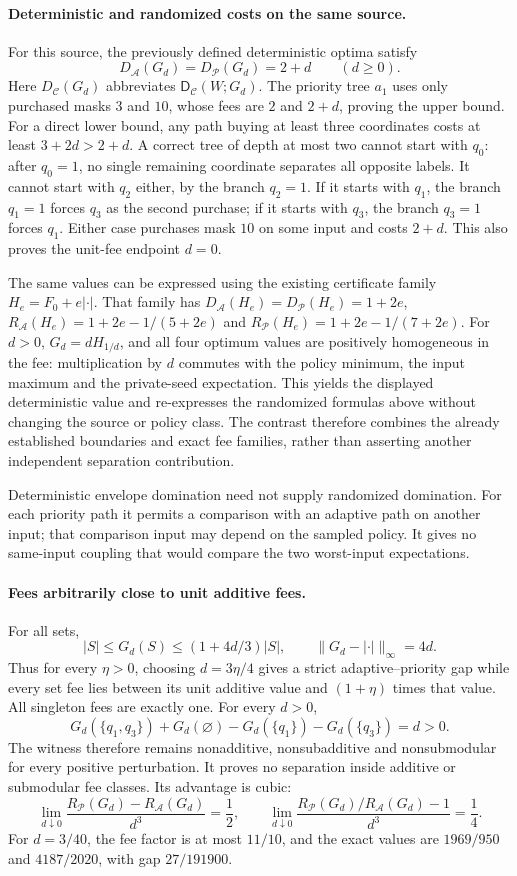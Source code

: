 \documentclass[pdflatex,sn-mathphys-num]{sn-jnl}
\newcommand{\DR}{\mathsf{D}}
\theoremstyle{thmstyleone}
\theoremstyle{thmstylethree}
\theoremstyle{thmstyletwo}
\begin{document}
\paragraph*{Deterministic and randomized costs on the same source.}
For this source, the previously defined deterministic optima satisfy
\[
 D_{\mathcal A}(G_d)=D_{\mathcal P}(G_d)=2+d\qquad(d\geq0).
\]
Here $D_{\mathcal C}(G_d)$ abbreviates
$\DR_{\mathcal C}(W;G_d)$.
The priority tree $a_1$ uses only purchased masks $3$ and $10$, whose
fees are $2$ and $2+d$, proving the upper bound. For a direct lower
bound, any path buying at least three coordinates costs at least
$3+2d>2+d$. A correct tree of depth at most two cannot start with
$q_0$: after $q_0=1$, no single remaining coordinate separates all
opposite labels. It cannot start with $q_2$ either, by the branch
$q_2=1$. If it starts with $q_1$, the branch $q_1=1$ forces $q_3$
as the second purchase; if it starts with $q_3$, the branch $q_3=1$
forces $q_1$. Either case purchases mask $10$ on some input and costs
$2+d$. This also proves the unit-fee endpoint $d=0$.

The same values can be expressed using the existing certificate
family $H_e=F_0+e|\cdot|$. That family has
$D_{\mathcal A}(H_e)=D_{\mathcal P}(H_e)=1+2e$,
$R_{\mathcal A}(H_e)=1+2e-1/(5+2e)$ and
$R_{\mathcal P}(H_e)=1+2e-1/(7+2e)$.
For $d>0$, $G_d=dH_{1/d}$, and all four optimum values are positively
homogeneous in the fee: multiplication by $d$ commutes with the
policy minimum, the input maximum and the private-seed expectation.
This yields the displayed deterministic value and re-expresses the
randomized formulas above without changing the source or policy
class. The contrast therefore combines the already established
boundaries and exact fee families, rather than asserting another
independent separation contribution.

Deterministic envelope domination need not supply randomized
domination. For each priority path it permits a comparison with an
adaptive path on another input; that comparison input may depend on
the sampled policy. It gives no same-input coupling that would
compare the two worst-input expectations.

\paragraph*{Fees arbitrarily close to unit additive fees.}
For all sets,
\[
 |S|\le G_d(S)\le(1+4d/3)|S|,
 \qquad \|G_d-|\cdot|\|_\infty=4d.
\]
Thus for every $\eta>0$, choosing $d=3\eta/4$ gives a strict
adaptive--priority gap while every set fee lies between its unit
additive value and $(1+\eta)$ times that value. All singleton fees are
exactly one. For every $d>0$,
\[
 G_d(\{q_1,q_3\})+G_d(\varnothing)
       -G_d(\{q_1\})-G_d(\{q_3\})=d>0.
\]
The witness therefore remains nonadditive, nonsubadditive and
nonsubmodular for every positive perturbation. It proves no separation
inside additive or submodular fee classes. Its advantage is cubic:
\[
 \lim_{d\downarrow0}
 \frac{R_{\mathcal P}(G_d)-R_{\mathcal A}(G_d)}{d^3}=\frac12,
 \qquad
 \lim_{d\downarrow0}
 \frac{R_{\mathcal P}(G_d)/R_{\mathcal A}(G_d)-1}{d^3}=\frac14.
\]
For $d=3/40$, the fee factor is at most $11/10$, and the exact values
are $1969/950$ and $4187/2020$, with gap $27/191900$.
\end{document}
